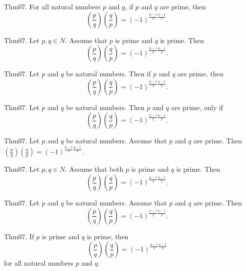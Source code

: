 \documentclass{article}
\begin{document}
Thm07. For all natural numbers $p$ and $q$, if $p$ and $q$ are prime, then $$\left(\frac{ p }{ q }\right) \left(\frac{ q }{ p }\right) = (- 1)^ {\frac{ p - 1}{2}\frac{ q - 1}{2}}.$$

Thm07. Let $p , q \in N$. Assume that $p$ is prime and $q$ is prime. Then $$\left(\frac{ p }{ q }\right) \left(\frac{ q }{ p }\right) = (- 1)^ {\frac{ p - 1}{2}\frac{ q - 1}{2}}.$$

Thm07. Let $p$ and $q$ be natural numbers. Then if $p$ and $q$ are prime, then $$\left(\frac{ p }{ q }\right) \left(\frac{ q }{ p }\right) = (- 1)^ {\frac{ p - 1}{2}\frac{ q - 1}{2}}.$$

Thm07. Let $p$ and $q$ be natural numbers. Then $p$ and $q$ are prime, only if $$\left(\frac{ p }{ q }\right) \left(\frac{ q }{ p }\right) = (- 1)^ {\frac{ p - 1}{2}\frac{ q - 1}{2}}.$$

Thm07. Let $p$ and $q$ be natural numbers. Assume that $p$ and $q$ are prime. Then $\left(\frac{ p }{ q }\right) \left(\frac{ q }{ p }\right) = (- 1)^ {\frac{ p - 1}{2}\frac{ q - 1}{2}}$.

Thm07. Let $p , q \in N$. Assume that both $p$ is prime and $q$ is prime. Then $$\left(\frac{ p }{ q }\right) \left(\frac{ q }{ p }\right) = (- 1)^ {\frac{ p - 1}{2}\frac{ q - 1}{2}}.$$

Thm07. Let $p$ and $q$ be natural numbers. Assume that $p$ and $q$ are prime. Then $$\left(\frac{ p }{ q }\right) \left(\frac{ q }{ p }\right) = (- 1)^ {\frac{ p - 1}{2}\frac{ q - 1}{2}}.$$

Thm07. If $p$ is prime and $q$ is prime, then $$\left(\frac{ p }{ q }\right) \left(\frac{ q }{ p }\right) = (- 1)^ {\frac{ p - 1}{2}\frac{ q - 1}{2}}$$ for all natural numbers $p$ and $q$.
\end{document}
